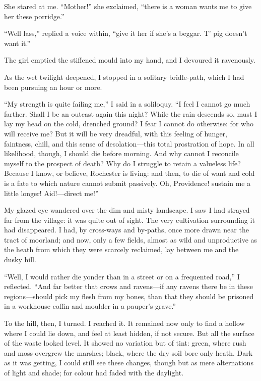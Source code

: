 She stared at me. \enquote{Mother!} she exclaimed, \enquote{there is a
woman wants me to give her these porridge.}

\enquote{Well lass,} replied a voice within, \enquote{give it her if
she's a beggar. T' pig doesn't want it.}

The girl emptied the stiffened mould into my hand, and I devoured it
ravenously.

As the wet twilight deepened, I stopped in a solitary bridle-path, which
I had been pursuing an hour or more.

\enquote{My strength is quite failing me,} I said in a soliloquy. 
\enquote{I feel I cannot go much farther. Shall I be an outcast again
this night? While the rain descends so, must I lay my head on the cold,
drenched ground? I fear I cannot do otherwise: for who will receive
me? But it will be very dreadful, with this feeling of hunger,
faintness, chill, and this sense of desolation---this total prostration
of hope. In all likelihood, though, I should die before morning. And
why cannot I reconcile myself to the prospect of death? Why do I
struggle to retain a valueless life? Because I know, or believe, \Mr{}
 Rochester is living: and then, to die of want and cold is a fate to
which nature cannot submit passively. Oh, Providence! sustain me a
little longer! Aid!---direct me!}

My glazed eye wandered over the dim and misty landscape. I saw I had
strayed far from the village: it was quite out of sight. The very
cultivation surrounding it had disappeared. I had, by cross-ways and
by-paths, once more drawn near the tract of moorland; and now, only a
few fields, almost as wild and unproductive as the heath from which they
were scarcely reclaimed, lay between me and the dusky hill.

\enquote{Well, I would rather die yonder than in a street or on a
frequented road,} I reflected. \enquote{And far better that crows and
ravens---if any ravens there be in these regions---should pick my flesh
from my bones, than that they should be prisoned in a workhouse coffin
and moulder in a pauper's grave.}

To the hill, then, I turned. I reached it. It remained now only to
find a hollow where I could lie down, and feel at least hidden, if not
secure. But all the surface of the waste looked level. It showed no
variation but of tint: green, where rush and moss overgrew the marshes;
black, where the dry soil bore only heath. Dark as it was getting, I
could still see these changes, though but as mere alternations of light
and shade; for colour had faded with the daylight.

